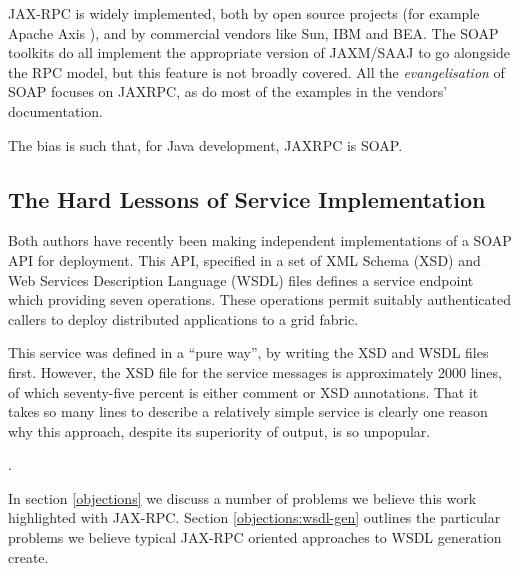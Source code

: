 JAX-RPC is widely implemented, both by open
source projects (for example Apache Axis \cite{axis}), and by
commercial vendors like Sun, IBM and BEA. The SOAP toolkits do all
implement the appropriate version of JAXM/SAAJ to go alongside the RPC
model, but this feature is not broadly covered. All the
\emph{evangelisation} of SOAP focuses on JAXRPC, as do most of the
examples in the vendors' documentation.

The bias is such that, for Java development, JAXRPC is SOAP. 

\subsection{The Hard Lessons of Service Implementation}
\label{intro:experience}

Both authors have recently been making independent implementations of
a SOAP API for deployment. This API, specified in a set of XML Schema
(XSD) \cite{spec:XSD} and Web Services Description Language (WSDL)
files \cite{spec:WSDL-11} defines a service endpoint which providing
seven operations. These operations permit suitably authenticated
callers to deploy distributed applications to a grid fabric.

This service was defined in a ``pure way'', by writing the XSD and
WSDL files first.  However, the XSD file for the service messages is
approximately 2000 lines, of which seventy-five percent is either
comment or XSD annotations. That it takes so many lines to describe a
relatively simple service is clearly one reason why this approach,
despite its superiority of output, is so unpopular. 

.

In section \ref{objections} we discuss a number of problems we believe
this work highlighted with JAX-RPC. Section \ref{objections:wsdl-gen}
outlines the particular problems we believe typical JAX-RPC oriented
approaches to WSDL generation create.



